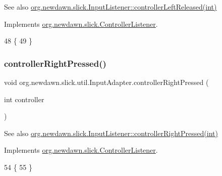 \begin{DoxySeeAlso}{See also}
\mbox{\hyperlink{interfaceorg_1_1newdawn_1_1slick_1_1_controller_listener_ad2f898f0efe21771a0d9568c454dea0d}{org.\+newdawn.\+slick.\+Input\+Listener\+::controller\+Left\+Released(int)}} 
\end{DoxySeeAlso}


Implements \mbox{\hyperlink{interfaceorg_1_1newdawn_1_1slick_1_1_controller_listener_ad2f898f0efe21771a0d9568c454dea0d}{org.\+newdawn.\+slick.\+Controller\+Listener}}.


\begin{DoxyCode}
48                                                        \{
49     \}
\end{DoxyCode}
\mbox{\label{classorg_1_1newdawn_1_1slick_1_1util_1_1_input_adapter_a558dd87511a7ab61be9d895476e91444}} 
\subsubsection{\texorpdfstring{controller\+Right\+Pressed()}{controllerRightPressed()}}
{\footnotesize\ttfamily void org.\+newdawn.\+slick.\+util.\+Input\+Adapter.\+controller\+Right\+Pressed (\begin{DoxyParamCaption}\item[{int}]{controller }\end{DoxyParamCaption})\hspace{0.3cm}{\ttfamily [inline]}}

\begin{DoxySeeAlso}{See also}
\mbox{\hyperlink{interfaceorg_1_1newdawn_1_1slick_1_1_controller_listener_ae4ac64996df9778c4987705275792780}{org.\+newdawn.\+slick.\+Input\+Listener\+::controller\+Right\+Pressed(int)}} 
\end{DoxySeeAlso}


Implements \mbox{\hyperlink{interfaceorg_1_1newdawn_1_1slick_1_1_controller_listener_ae4ac64996df9778c4987705275792780}{org.\+newdawn.\+slick.\+Controller\+Listener}}.


\begin{DoxyCode}
54                                                        \{
55     \}
\end{DoxyCode}
\mbox{\label{classorg_1_1newdawn_1_1slick_1_1util_1_1_input_adapter_ae2c91a34637c5d9af99d2098878b367e}} 
